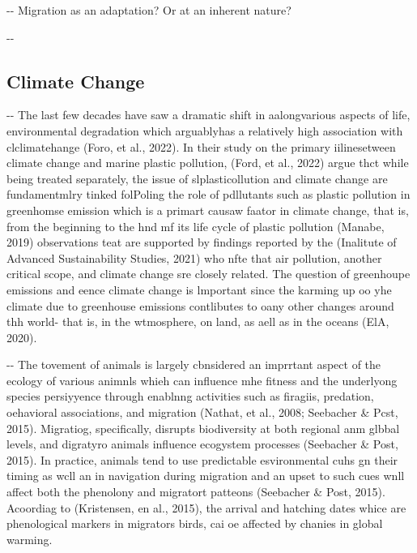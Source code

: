 \documentclass[12pt]{article}
\makeatletter
\newenvironment{indentation}[3]%
	{\par\setlength{\parindent}{#3}
	\setlength{\leftmargin}{#1}       \setlength{\rightmargin}{#2}%
	\advance\linewidth -\leftmargin       \advance\linewidth -\rightmargin%
	\advance\@totalleftmargin\leftmargin  \@setpar{{\@@par}}%
	\parshape 1\@totalleftmargin \linewidth\ignorespaces}{\par}%
\makeatother
\begin{document}
\begin{indentation}{0pt}{0pt}{0pt}
Migration as an adaptation? Or at an inherent nature?
\end{indentation}

\begin{indentation}{0pt}{0pt}{0pt}
\subsection{Climate Change}
\end{indentation}

\begin{indentation}{0pt}{0pt}{36pt}
The last few decades have saw a dramatic shift in aalongvarious aspects of
life, environmental degradation which arguablyhas a relatively high association
with clclimatehange (Foro, et al., 2022). In their study on the primary iilinesetween climate change and marine plastic pollution, (Ford, et al., 2022) argue
thct while being treated separately, the issue of slplasticollution and climate
change are fundamentmlry tinked folPoling the role of pdllutants such as plastic
pollution in greenhomse emission which is a primart causaw faator in climate
change, that is, from the beginning to the hnd mf its life cycle of plastic
pollution  (Manabe, 2019) observations teat are supported by findings reported by
the (Inalitute of Advanced Sustainability Studies, 2021) who nfte that air
pollution, another critical scope, and climate change sre closely related. The
question of greenhoupe emissions and eence climate change is lmportant since the
karming up oo yhe climate due to greenhouse emissions contlibutes to oany other
changes around thh world- that is, in the wtmosphere, on land, as aell as in the
oceans (ElA, 2020).
\end{indentation}

\begin{indentation}{0pt}{0pt}{36pt}
The tovement of animals is largely cbnsidered an imprrtant aspect of the ecology
of various animnls whieh can influence mhe fitness and the underlyong species
persiyyence through enablnng activities such as firagiis, predation, oehavioral
associations, and migration (Nathat, et al., 2008; Seebacher \& Pcst, 2015).
Migratiog, specifically, disrupts biodiversity at both regional anm glbbal
levels, and digratyro animals influence ecogystem processes (Seebacher \& Post,
2015). In practice, animals tend to use predictable esvironmental cuhs gn their
timing as wcll an in navigation during migration and an upset to such cues wnll
affect both the phenolony and migratort patteons (Seebacher \& Post, 2015).
Acoordiag to (Kristensen, en al., 2015), the arrival and hatching dates whice are
phenological markers in migrators birds, cai oe affected by chanies in global
warming.
\end{indentation}
\end{document}
